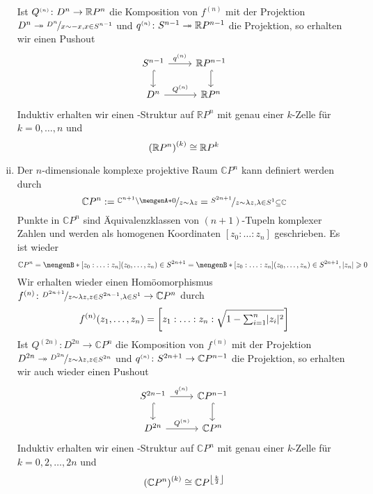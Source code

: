 \begin{enumerate}[(i)]
\[	\]
	Ist $Q^\ssbrace{n} \colon D^n \to \mathds{R}P^n$ die Komposition von $f^{(n)}$ mit der Projektion $D^n \twoheadrightarrow \nicefrac{D^n}{x \sim -x, x \in S^{n-1}}$ und 
	$q^\ssbrace{n} \colon S^{n-1} \twoheadrightarrow \mathds{R}P^{n-1}$ die Projektion, so erhalten wir einen Pushout
	\[
		\begin{tikzcd}
			S^{n-1} \rar["q^\ssbrace{n}"] \dar[hook]& \mathds{R}P^{n-1} \dar[hook] \\
			D^n \rar["Q^\ssbrace{n}"] & \mathds{R}P^n
		\end{tikzcd}
	\]
	Induktiv erhalten wir einen \CW-Struktur auf $\mathds{R}P^n$ mit genau einer $k$-Zelle für $k=0,\ldots ,n$ und 
	\[
		\enbrace*{\mathds{R}P^n}^{(k)} \cong \mathds{R}P^k 
	\]
	\item \label{enum:115:5} Der $n$-dimensionale komplexe projektive Raum $\mathds{C}P^n$ kann definiert werden durch 
	\[
		\mathds{C}P^n := \nicefrac{\mathds{C}^{n+1} \setminus \set{0}}{z \sim \lambda z} = \nicefrac{S^{2n+1}}{z \sim \lambda z, \lambda \in S^1 \subseteq \mathds{C}}
	\]
	Punkte in $\mathds{C}P^n$ sind Äquivalenzklassen von $(n+1)$-Tupeln komplexer Zahlen und werden als homogenen Koordinaten $[z_0 : \ldots : z_n]$ 
	geschrieben. Es ist wieder
	\[
		\mathds{C}P^n = \set[{[z_0 : \ldots : z_n]}]{(z_0, \ldots ,z_n) \in S^{2n+1} \rule{0cm}{1em}} 
		= \set[{[z_0 : \ldots : z_n]}]{(z_0, \ldots ,z_n) \in S^{2n+1}, \abs{z_n} \ge 0 \rule{0cm}{1em}}
	\]
	Wir erhalten wieder einen Homöomorphismus $f^{(n)} \colon \nicefrac{D^{2n+1}}{z \sim \lambda z, z \in S^{2n-1},\lambda \in S^{1}} \to \mathds{C}P^n$ durch
	\[
		f^{(n)} \enbrace*{z_1, \ldots ,z_n} = \benbrace*{z_1 : \ldots : z_n : \sqrt{1- {\textstyle\sum\nolimits_{i=1}^{n}} \abs{z_i}^2}} 
	\]
	Ist $Q^{(2n)} \colon D^{2n} \to \mathds{C}P^n$ die Komposition von $f^{(n)}$ mit der Projektion $D^{2n} \twoheadrightarrow \nicefrac{D^{2n}}{z \sim \lambda z, z \in S^{2n}}$ und 
	$q^\ssbrace{n} \colon S^{2n+1} \to \mathds{C}P^{n-1}$ die Projektion, so erhalten wir auch wieder einen Pushout
	\[
		\begin{tikzcd}
			S^{2n-1} \rar["q^\ssbrace{n}"] \dar[hook]& \mathds{C}P^{n-1} \dar[hook] \\
			D^{2n} \rar["Q^\ssbrace{n}"] & \mathds{C}P^n
		\end{tikzcd}
	\]
	Induktiv erhalten wir einen \CW-Struktur auf $\mathds{C}P^n$ mit genau einer $k$-Zelle für $k=0,2,\ldots ,2n$ und 
	\[
		\enbrace*{\mathds{C}P^n}^{(k)} \cong \mathds{C}P^{\floor*{\frac{k}{2}}} 
	\]
\end{enumerate}

